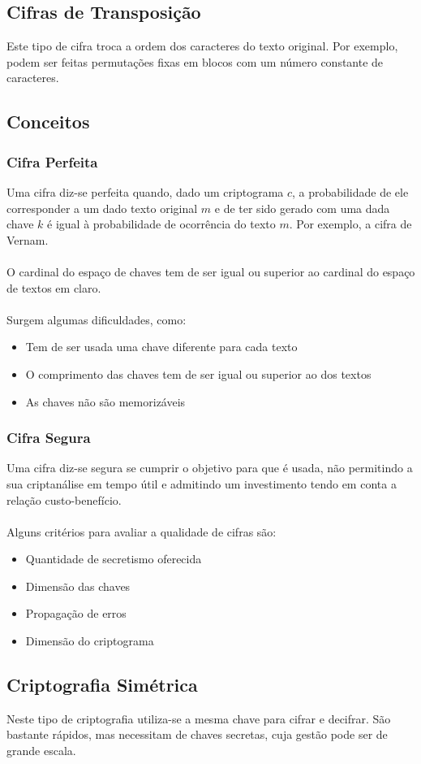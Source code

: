 \documentclass[10pt,a4paper]{report}
\begin{document}
\subsection{Cifras de Transposição}
Este tipo de cifra troca a ordem dos caracteres do texto original. Por exemplo, podem ser feitas permutações fixas em blocos com um número constante de caracteres.
\subsection{Conceitos}
\subsubsection{Cifra Perfeita}
Uma cifra diz-se perfeita quando, dado um criptograma $c$, a probabilidade de ele corresponder a um dado texto original $m$ e de ter sido gerado com uma dada chave $k$ é igual à probabilidade de ocorrência do texto $m$. Por exemplo, a cifra de Vernam.\\
\\
O cardinal do espaço de chaves tem de ser igual ou superior ao cardinal do espaço de textos em claro.\\
\\
Surgem algumas dificuldades, como:
\begin{itemize}
\item Tem de ser usada uma chave diferente para cada texto
\item O comprimento das chaves tem de ser igual ou superior ao dos textos
\item As chaves não são memorizáveis
\end{itemize}
\subsubsection{Cifra Segura}
Uma cifra diz-se segura se cumprir o objetivo para que é usada, não permitindo a sua criptanálise em tempo útil e admitindo um investimento tendo em conta a relação custo-benefício.\\
\\
Alguns critérios para avaliar a qualidade de cifras são:
\begin{itemize}
\item Quantidade de secretismo oferecida
\item Dimensão das chaves
\item Propagação de erros
\item Dimensão do criptograma
\end{itemize}
\subsection{Criptografia Simétrica}
Neste tipo de criptografia utiliza-se a mesma chave para cifrar e decifrar. São bastante rápidos, mas necessitam de chaves secretas, cuja gestão pode ser de grande escala.
\end{document}
